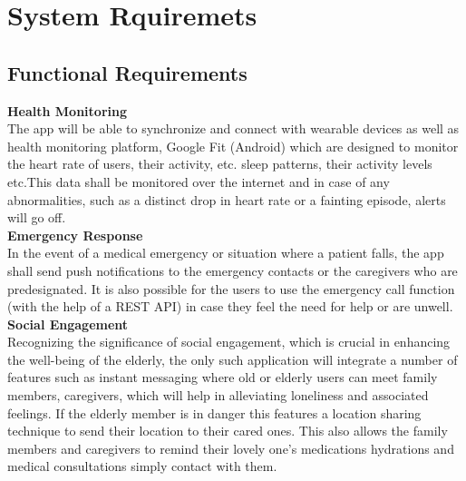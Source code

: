 \section{System Rquiremets}
\subsection{Functional Requirements}
\textbf{Health Monitoring} \\[0.25cm]
 The app will be able to synchronize and connect with wearable devices as well as health monitoring platform, Google Fit (Android) which are designed to monitor the heart rate of users, their activity, etc. sleep patterns, their activity levels etc.This data shall be monitored over the internet and in case of any abnormalities, such as a distinct drop in heart rate or a fainting episode, alerts will go off. \\[0.25 cm]
\textbf{Emergency Response} \\[0.25cm]
In the event of a medical emergency or situation where a patient falls, the app shall send push notifications to the emergency contacts or the caregivers who are predesignated. It is also possible for the users to use the emergency call function (with the help of a REST API) in case they feel the need for help or are unwell. \\[0.25cm]
\textbf{Social Engagement} \\[0.25cm]
Recognizing the significance of social engagement, which is crucial in enhancing the well-being of the elderly, the only such application will integrate a number of features such as instant messaging where old or elderly users can meet family members, caregivers, which will help in alleviating loneliness and associated feelings. If the elderly member is in danger this features a location sharing technique to send their location to their cared ones. This also allows the family members and caregivers to remind their lovely one’s medications hydrations and medical consultations simply contact with them. 
